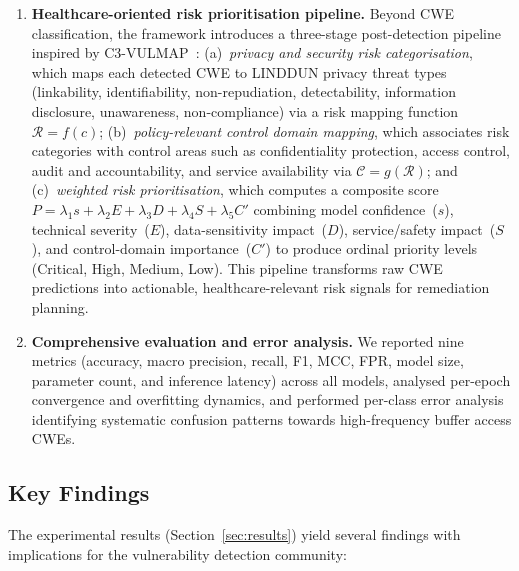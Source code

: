 \documentclass[conference]{IEEEtran}
\begin{document}
\begin{enumerate}
    \item \textbf{Healthcare-oriented risk prioritisation pipeline.}
          Beyond CWE classification, the framework introduces a three-stage
          post-detection pipeline inspired by
          C3-VULMAP~\cite{santos2023c3vulmap}:
          (a)~\emph{privacy and security risk categorisation}, which maps
          each detected CWE to LINDDUN privacy threat types (linkability,
          identifiability, non-repudiation, detectability, information
          disclosure, unawareness, non-compliance) via a risk mapping
          function $\mathcal{R} = f(c)$;
          (b)~\emph{policy-relevant control domain mapping}, which
          associates risk categories with control areas such as
          confidentiality protection, access control, audit and
          accountability, and service availability via
          $\mathcal{C} = g(\mathcal{R})$; and
          (c)~\emph{weighted risk prioritisation}, which computes a
          composite score
          $P = \lambda_1 s + \lambda_2 E + \lambda_3 D + \lambda_4 S
          + \lambda_5 C'$
          combining model confidence~($s$), technical severity~($E$),
          data-sensitivity impact~($D$), service/safety impact~($S$),
          and control-domain importance~($C'$) to produce ordinal
          priority levels (Critical, High, Medium, Low).
          This pipeline transforms raw CWE predictions into actionable,
          healthcare-relevant risk signals for remediation planning.

    \item \textbf{Comprehensive evaluation and error analysis.}
          We reported nine metrics (accuracy, macro precision, recall, F1,
          MCC, FPR, model size, parameter count, and inference latency)
          across all models, analysed per-epoch convergence and overfitting
          dynamics, and performed per-class error analysis identifying
          systematic confusion patterns towards high-frequency buffer
          access CWEs.
\end{enumerate}

\subsection{Key Findings}
\label{sec:key_findings}

The experimental results (Section~\ref{sec:results}) yield several findings
with implications for the vulnerability detection community:
\end{document}
